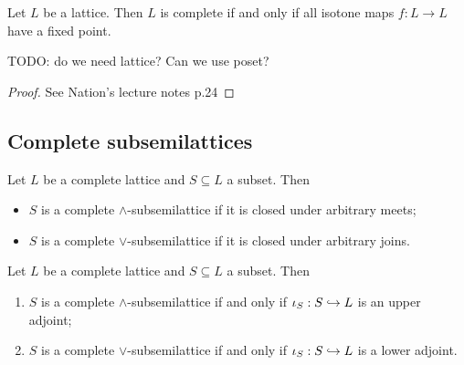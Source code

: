 \begin{theorem}
Let $L$ be a lattice. Then $L$ is complete \textup{if and only if} all isotone maps $f: L\to L$ have a fixed point.
\end{theorem}
TODO: do we need lattice? Can we use poset?
\begin{proof}
See Nation's lecture notes p.24
\end{proof}

\subsection{Complete subsemilattices}
Let $L$ be a complete lattice and $S\subseteq L$ a subset. Then
\begin{itemize}
\item $S$ is a complete $\wedge$-subsemilattice if it is closed under arbitrary meets;
\item $S$ is a complete $\vee$-subsemilattice if it is closed under arbitrary joins.
\end{itemize}

\begin{lemma}
Let $L$ be a complete lattice and $S\subseteq L$ a subset. Then
\begin{enumerate}
\item $S$ is a complete $\wedge$-subsemilattice \textup{if and only if} $\operatorname{\iota}_S: S\hookrightarrow L$ is an upper adjoint;
\item $S$ is a complete $\vee$-subsemilattice \textup{if and only if} $\operatorname{\iota}_S: S\hookrightarrow L$ is a lower adjoint.
\end{enumerate}
\end{lemma}

